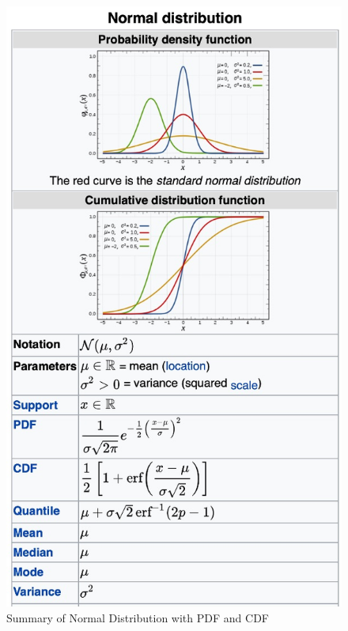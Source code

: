 \documentclass[
  12 pt,
  a4paper,
]{book}
\numberwithin{equation}{section}
\theoremstyle{plain}      %
\theoremstyle{definition} %
\theoremstyle{remark}     %
\theoremstyle{note}         %
\begin{document}
\begin{figure}[H]
    \centering
    \begin{minipage}[t]{0.55\textwidth}
        \centering
        \includegraphics[width=\textwidth]{pictures/normal_distribution.jpeg}
        \caption{Summary of Normal Distribution with PDF and CDF}
    \end{minipage}
    \hfill

\end{figure}
\end{document}

